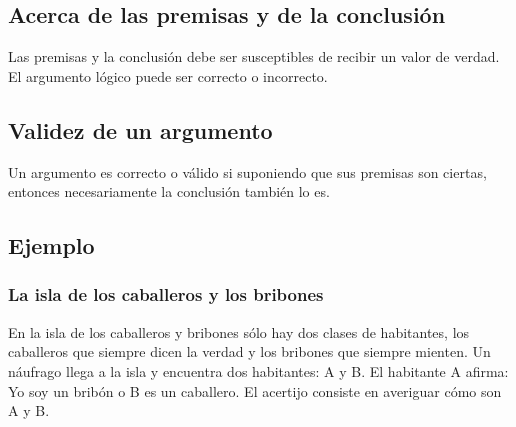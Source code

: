 \documentclass[a4paper]{article}
\begin{document}
\subsection{Acerca de las premisas y de la conclusión}
\noindent
Las premisas y la conclusión debe ser susceptibles de recibir un valor de verdad. El argumento lógico puede ser
correcto o incorrecto.
\subsection{Validez de un argumento}
\noindent
Un argumento es correcto o válido si suponiendo que sus premisas son ciertas, entonces necesariamente la 
conclusión también lo es.
\subsection{Ejemplo}
\subsubsection{La isla de los caballeros y los bribones}
\noindent
En la isla de los caballeros y bribones sólo hay dos clases de habitantes, los caballeros que siempre dicen 
la verdad y los bribones que siempre mienten.
\newline
Un náufrago llega a la isla y encuentra dos habitantes: A y B. El habitante A afirma: Yo soy un bribón o 
B es un caballero. El acertijo consiste en averiguar cómo son A y B.
\end{document}
